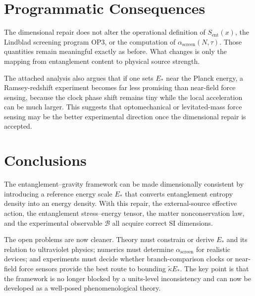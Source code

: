 \documentclass[11pt]{article}
\begin{document}
\section{Programmatic Consequences}

The dimensional repair does not alter the operational definition of $S_{\mathrm{ent}}(x)$, the Lindblad screening program OP3, or the computation of $\alpha_{\mathrm{screen}}(N,\tau)$. Those quantities remain meaningful exactly as before. What changes is only the mapping from entanglement content to physical source strength.

The attached analysis also argues that if one sets $E_*$ near the Planck energy, a Ramsey-redshift experiment becomes far less promising than near-field force sensing, because the clock phase shift remains tiny while the local acceleration can be much larger. This suggests that optomechanical or levitated-mass force sensing may be the better experimental direction once the dimensional repair is accepted.

\section{Conclusions}

The entanglement--gravity framework can be made dimensionally consistent by introducing a reference energy scale $E_*$ that converts entanglement entropy density into an energy density. With this repair, the external-source effective action, the entanglement stress--energy tensor, the matter nonconservation law, and the experimental observable $\mathcal{B}$ all acquire correct SI dimensions.

The open problems are now cleaner. Theory must constrain or derive $E_*$ and its relation to ultraviolet physics; numerics must determine $\alpha_{\mathrm{screen}}$ for realistic devices; and experiments must decide whether branch-comparison clocks or near-field force sensors provide the best route to bounding $\tilde{\kappa}E_*$. The key point is that the framework is no longer blocked by a units-level inconsistency and can now be developed as a well-posed phenomenological theory.
\end{document}
